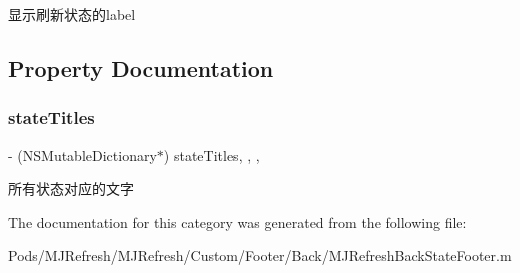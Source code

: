 显示刷新状态的label 

\subsection{Property Documentation}
\mbox{\label{category_m_j_refresh_back_state_footer_07_08_aa5edbb5b7280b2fdcbab8e71935dcfcb}} 
\subsubsection{\texorpdfstring{state\+Titles}{stateTitles}}
{\footnotesize\ttfamily -\/ (N\+S\+Mutable\+Dictionary$\ast$) state\+Titles\hspace{0.3cm}{\ttfamily [read]}, {\ttfamily [write]}, {\ttfamily [nonatomic]}, {\ttfamily [strong]}}

所有状态对应的文字 

The documentation for this category was generated from the following file\+:\begin{DoxyCompactItemize}
\item 
Pods/\+M\+J\+Refresh/\+M\+J\+Refresh/\+Custom/\+Footer/\+Back/M\+J\+Refresh\+Back\+State\+Footer.\+m\end{DoxyCompactItemize}
